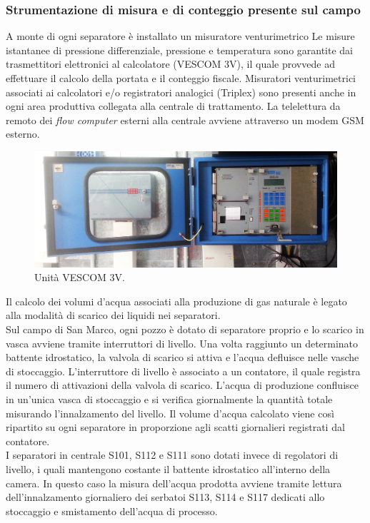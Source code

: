 \subsubsection*{Strumentazione di misura e di conteggio presente sul campo}
A monte di ogni separatore è installato un misuratore venturimetrico Le misure istantanee di pressione differenziale, pressione e temperatura sono garantite dai trasmettitori elettronici al calcolatore (VESCOM 3V), il quale provvede ad effettuare il calcolo della portata e il conteggio fiscale. Misuratori venturimetrici associati ai calcolatori e/o registratori analogici (Triplex) sono presenti anche in ogni area produttiva collegata alla centrale di trattamento. La telelettura da remoto dei \textit{flow computer} esterni alla centrale avviene attraverso un modem GSM esterno.\\
\begin{figure}[htbp]
    \centering
    \includegraphics[width=\textwidth]{fig/test/vescom}  
	\caption{Unità VESCOM 3V.}
	\label{fig:vescom}
\end{figure}
Il calcolo dei volumi d'acqua associati alla produzione di gas naturale è legato alla modalità di scarico dei liquidi nei separatori.\\
Sul campo di San Marco, ogni pozzo è dotato di separatore proprio e lo scarico in vasca avviene tramite interruttori di livello. Una volta raggiunto un determinato battente idrostatico, la valvola di scarico si attiva e l'acqua defluisce nelle vasche di stoccaggio. L'interruttore di livello è associato a un contatore, il quale registra il numero di attivazioni della valvola di scarico. L'acqua di produzione confluisce in un'unica vasca di stoccaggio e si verifica giornalmente la quantità totale misurando l'innalzamento del livello. Il volume d'acqua calcolato viene così ripartito su ogni separatore in proporzione agli scatti giornalieri registrati dal contatore.\\
I separatori in centrale S101, S112 e S111 sono dotati invece di regolatori di livello, i quali mantengono costante il battente idrostatico all'interno della camera. In questo caso la misura dell'acqua prodotta avviene tramite lettura dell'innalzamento giornaliero dei serbatoi S113, S114 e S117 dedicati allo stoccaggio e smistamento dell'acqua di processo.

